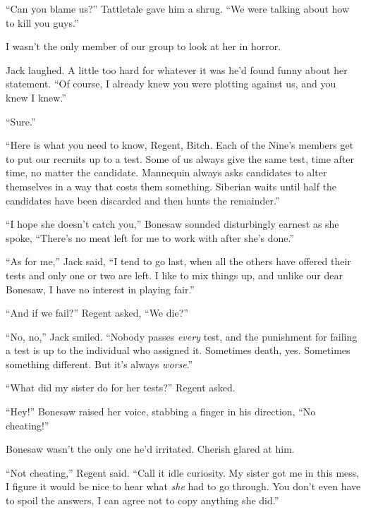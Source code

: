 ``Can you blame us?'' Tattletale gave him a shrug.  ``We were talking about how to kill you guys.''



I wasn't the only member of our group to look at her in horror.



Jack laughed.  A little too hard for whatever it was he'd found funny about her statement.  ``Of course, I already knew you were plotting against us, and you knew I knew.''



``Sure.''



``Here is what you need to know, Regent, Bitch.  Each of the Nine's members get to put our recruits up to a test.  Some of us always give the same test, time after time, no matter the candidate.  Mannequin always asks candidates to alter themselves in a way that costs them something.  Siberian waits until half the candidates have been discarded and then hunts the remainder.''



``I hope she doesn't catch you,'' Bonesaw sounded disturbingly earnest as she spoke, ``There's no meat left for me to work with after she's done.''



``As for me,'' Jack said, ``I tend to go last, when all the others have offered their tests and only one or two are left.  I like to mix things up, and unlike our dear Bonesaw, I have no interest in playing fair.''



``And if we fail?'' Regent asked, ``We die?''



``No, no,'' Jack smiled.  ``Nobody passes \emph{every} test, and the punishment for failing a test is up to the individual who assigned it.  Sometimes death, yes.  Sometimes something different.  But it's always \emph{worse}.''



``What did my sister do for her tests?'' Regent asked.



``Hey!'' Bonesaw raised her voice, stabbing a finger in his direction, ``No cheating!''



Bonesaw wasn't the only one he'd irritated.  Cherish glared at him.



``Not cheating,'' Regent said.  ``Call it idle curiosity.  My sister got me in this mess, I figure it would be nice to hear what \emph{she} had to go through.  You don't even have to spoil the answers, I can agree not to copy anything she did.''



